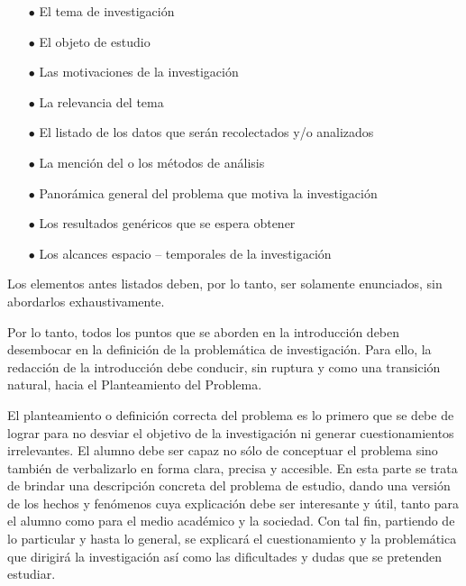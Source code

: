 \documentclass[10pt,a4paper]{protocol}
\begin{document}
\begin{itemize}
	\item[$ \bullet $] El tema de investigación
	\item[$ \bullet $]El objeto de estudio
	\item[$ \bullet $]Las motivaciones de la investigación
	\item[$ \bullet $]La relevancia del tema
	\item[$ \bullet $]El listado de los datos que serán recolectados y/o analizados
	\item[$ \bullet $]La mención del o los métodos de análisis
	\item[$ \bullet $]Panorámica general del problema que motiva la investigación
	\item[$ \bullet $]Los resultados genéricos que se espera obtener
	\item[$ \bullet $]Los alcances espacio – temporales de la investigación
\end{itemize}

Los elementos antes listados deben, por lo tanto, ser solamente enunciados, sin abordarlos exhaustivamente. \\ \vspace*{0.5cm}

Por lo tanto, todos los puntos que se aborden en la introducción deben desembocar en la definición de la problemática de investigación. Para ello, la redacción de la introducción debe conducir, sin ruptura y como una transición natural, hacia el Planteamiento del Problema. \\ \vspace*{0.5cm}

El planteamiento o definición correcta del problema es lo primero que se debe de lograr para no desviar el objetivo de la investigación ni generar cuestionamientos irrelevantes. 	El alumno debe ser capaz no sólo de conceptuar el problema sino también de verbalizarlo en forma clara, precisa y accesible. En esta parte se trata de brindar una descripción concreta del problema de estudio, dando una versión de los hechos y fenómenos cuya explicación debe ser interesante y útil, tanto para el alumno como para el medio académico y la sociedad. Con tal fin, partiendo de lo particular y hasta lo general, se explicará el cuestionamiento y la problemática que dirigirá la investigación así como las dificultades y dudas que se pretenden estudiar. \\ \vspace*{0.5cm}
\end{document}
